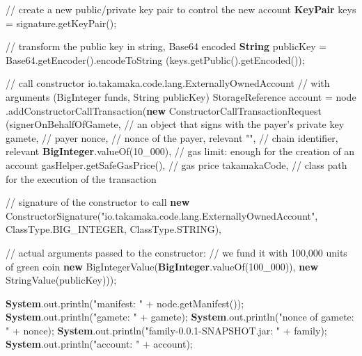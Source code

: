 \documentclass[a4paper,]{book}
\newenvironment{Shaded}{\begin{snugshade}}{\end{snugshade}}
\newcommand{\BuiltInTok}[1]{\textcolor[rgb]{0.39,0.29,0.61}{\textbf{#1}}}
\newcommand{\CommentTok}[1]{\textcolor[rgb]{0.54,0.53,0.53}{#1}}
\newcommand{\DecValTok}[1]{\textcolor[rgb]{0.69,0.50,0.00}{#1}}
\newcommand{\FunctionTok}[1]{\textcolor[rgb]{0.39,0.29,0.61}{#1}}
\newcommand{\KeywordTok}[1]{\textcolor[rgb]{0.12,0.11,0.11}{\textbf{#1}}}
\newcommand{\NormalTok}[1]{\textcolor[rgb]{0.12,0.11,0.11}{#1}}
\newcommand{\StringTok}[1]{\textcolor[rgb]{0.75,0.01,0.01}{#1}}
\renewenvironment{Shaded}{\begin{snugshade}\small}{\end{snugshade}}
\begin{document}
{\begin{Shaded}
\begin{Highlighting}[]
      \CommentTok{// create a new public/private key pair to control the new account}
      \BuiltInTok{KeyPair}\NormalTok{ keys = signature.}\FunctionTok{getKeyPair}\NormalTok{();}

      \CommentTok{// transform the public key in string, Base64 encoded}
      \BuiltInTok{String}\NormalTok{ publicKey = Base64.}\FunctionTok{getEncoder}\NormalTok{().}\FunctionTok{encodeToString}
\NormalTok{        (keys.}\FunctionTok{getPublic}\NormalTok{().}\FunctionTok{getEncoded}\NormalTok{());}

      \CommentTok{// call constructor io.takamaka.code.lang.ExternallyOwnedAccount}
      \CommentTok{// with arguments (BigInteger funds, String publicKey)}
\NormalTok{      StorageReference account = node}
\NormalTok{        .}\FunctionTok{addConstructorCallTransaction}\NormalTok{(}\KeywordTok{new}\NormalTok{ ConstructorCallTransactionRequest}
\NormalTok{          (signerOnBehalfOfGamete, }\CommentTok{// an object that signs with the payer's private key}
\NormalTok{           gamete, }\CommentTok{// payer}
\NormalTok{           nonce, }\CommentTok{// nonce of the payer, relevant}
           \StringTok{""}\NormalTok{, }\CommentTok{// chain identifier, relevant}
           \BuiltInTok{BigInteger}\NormalTok{.}\FunctionTok{valueOf}\NormalTok{(}\DecValTok{10_000}\NormalTok{), }\CommentTok{// gas limit: enough for the creation of an account}
\NormalTok{           gasHelper.}\FunctionTok{getSafeGasPrice}\NormalTok{(), }\CommentTok{// gas price}
\NormalTok{           takamakaCode, }\CommentTok{// class path for the execution of the transaction}

           \CommentTok{// signature of the constructor to call}
           \KeywordTok{new} \FunctionTok{ConstructorSignature}\NormalTok{(}\StringTok{"io.takamaka.code.lang.ExternallyOwnedAccount"}\NormalTok{,}
\NormalTok{             ClassType.}\FunctionTok{BIG_INTEGER}\NormalTok{, ClassType.}\FunctionTok{STRING}\NormalTok{),}

           \CommentTok{// actual arguments passed to the constructor:}
           \CommentTok{// we fund it with 100,000 units of green coin}
           \KeywordTok{new} \FunctionTok{BigIntegerValue}\NormalTok{(}\BuiltInTok{BigInteger}\NormalTok{.}\FunctionTok{valueOf}\NormalTok{(}\DecValTok{100_000}\NormalTok{)), }\KeywordTok{new} \FunctionTok{StringValue}\NormalTok{(publicKey)));}

      \BuiltInTok{System}\NormalTok{.}\FunctionTok{out}\NormalTok{.}\FunctionTok{println}\NormalTok{(}\StringTok{"manifest: "}\NormalTok{ + node.}\FunctionTok{getManifest}\NormalTok{());}
      \BuiltInTok{System}\NormalTok{.}\FunctionTok{out}\NormalTok{.}\FunctionTok{println}\NormalTok{(}\StringTok{"gamete: "}\NormalTok{ + gamete);}
      \BuiltInTok{System}\NormalTok{.}\FunctionTok{out}\NormalTok{.}\FunctionTok{println}\NormalTok{(}\StringTok{"nonce of gamete: "}\NormalTok{ + nonce);}
      \BuiltInTok{System}\NormalTok{.}\FunctionTok{out}\NormalTok{.}\FunctionTok{println}\NormalTok{(}\StringTok{"family-0.0.1-SNAPSHOT.jar: "}\NormalTok{ + family);}
      \BuiltInTok{System}\NormalTok{.}\FunctionTok{out}\NormalTok{.}\FunctionTok{println}\NormalTok{(}\StringTok{"account: "}\NormalTok{ + account);}


\end{Highlighting}
\end{Shaded}}
\end{document}
